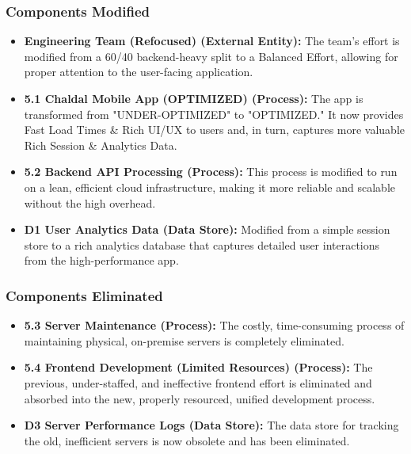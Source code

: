 \documentclass[12pt,a4paper]{article}
\begin{document}
\subsubsection{Components Modified}
\begin{tcolorbox}[colback=yellow!5!white,colframe=yellow!75!black,title=Modified]
\begin{itemize}
    \item \textbf{Engineering Team (Refocused) (External Entity):} The team's effort is modified from a 60/40 backend-heavy split to a Balanced Effort, allowing for proper attention to the user-facing application.
    \item \textbf{5.1 Chaldal Mobile App (OPTIMIZED) (Process):} The app is transformed from "UNDER-OPTIMIZED" to "OPTIMIZED." It now provides Fast Load Times \& Rich UI/UX to users and, in turn, captures more valuable Rich Session \& Analytics Data.
    \item \textbf{5.2 Backend API Processing (Process):} This process is modified to run on a lean, efficient cloud infrastructure, making it more reliable and scalable without the high overhead.
    \item \textbf{D1 User Analytics Data (Data Store):} Modified from a simple session store to a rich analytics database that captures detailed user interactions from the high-performance app.
\end{itemize}
\end{tcolorbox}

\subsubsection{Components Eliminated}
\begin{tcolorbox}[colback=red!5!white,colframe=red!75!black,title=Eliminated]
\begin{itemize}
    \item \textbf{5.3 Server Maintenance (Process):} The costly, time-consuming process of maintaining physical, on-premise servers is completely eliminated.
    \item \textbf{5.4 Frontend Development (Limited Resources) (Process):} The previous, under-staffed, and ineffective frontend effort is eliminated and absorbed into the new, properly resourced, unified development process.
    \item \textbf{D3 Server Performance Logs (Data Store):} The data store for tracking the old, inefficient servers is now obsolete and has been eliminated.
\end{itemize}
\end{tcolorbox}
\end{document}
